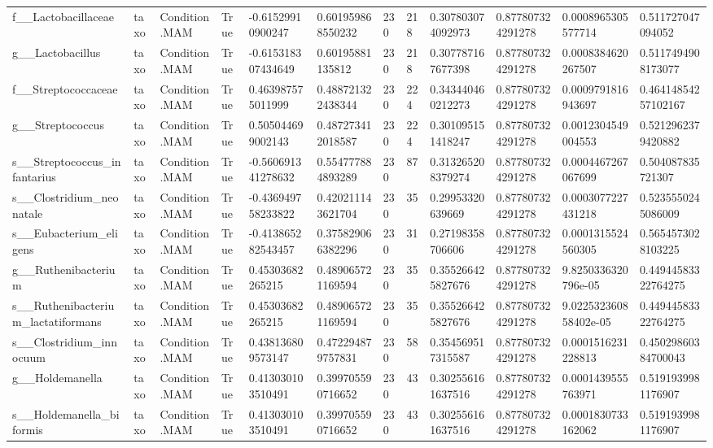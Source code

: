 \begin{longtable}{llllllllllll}
f\_\_Lactobacillaceae & taxo & Condition.MAM & True & -0.61529910900247 & 0.601959868550232 & 230 & 218 & 0.307803074092973 & 0.877807324291278 & 0.0008965305577714 & 0.511727047094052 \\
g\_\_Lactobacillus & taxo & Condition.MAM & True & -0.615318307434649 & 0.60195881135812 & 230 & 218 & 0.307787167677398 & 0.877807324291278 & 0.0008384620267507 & 0.5117494908173077 \\
f\_\_Streptococcaceae & taxo & Condition.MAM & True & 0.463987575011999 & 0.488721322438344 & 230 & 224 & 0.343440460212273 & 0.877807324291278 & 0.0009791816943697 & 0.46414854257102167 \\
g\_\_Streptococcus & taxo & Condition.MAM & True & 0.505044699002143 & 0.487273412018587 & 230 & 224 & 0.301095151418247 & 0.877807324291278 & 0.0012304549004553 & 0.5212962379420882 \\
s\_\_Streptococcus\_infantarius & taxo & Condition.MAM & True & -0.560691341278632 & 0.554777884893289 & 230 & 87 & 0.313265208379274 & 0.877807324291278 & 0.0004467267067699 & 0.504087835721307 \\
s\_\_Clostridium\_neonatale & taxo & Condition.MAM & True & -0.436949758233822 & 0.420211143621704 & 230 & 35 & 0.29953320639669 & 0.877807324291278 & 0.0003077227431218 & 0.5235550245086009 \\
s\_\_Eubacterium\_eligens & taxo & Condition.MAM & True & -0.413865282543457 & 0.375829066382296 & 230 & 31 & 0.27198358706606 & 0.877807324291278 & 0.0001315524560305 & 0.5654573028103225 \\
g\_\_Ruthenibacterium & taxo & Condition.MAM & True & 0.45303682265215 & 0.489065721169594 & 230 & 35 & 0.355266425827676 & 0.877807324291278 & 9.8250336320796e-05 & 0.44944583322764275 \\
s\_\_Ruthenibacterium\_lactatiformans & taxo & Condition.MAM & True & 0.45303682265215 & 0.489065721169594 & 230 & 35 & 0.355266425827676 & 0.877807324291278 & 9.022532360858402e-05 & 0.44944583322764275 \\
s\_\_Clostridium\_innocuum & taxo & Condition.MAM & True & 0.438136809573147 & 0.472294879757831 & 230 & 58 & 0.354569517315587 & 0.877807324291278 & 0.0001516231228813 & 0.45029860384700043 \\
g\_\_Holdemanella & taxo & Condition.MAM & True & 0.413030103510491 & 0.399705590716652 & 230 & 43 & 0.302556161637516 & 0.877807324291278 & 0.0001439555763971 & 0.5191939981176907 \\
s\_\_Holdemanella\_biformis & taxo & Condition.MAM & True & 0.413030103510491 & 0.399705590716652 & 230 & 43 & 0.302556161637516 & 0.877807324291278 & 0.0001830733162062 & 0.5191939981176907 \\

\end{longtable}
